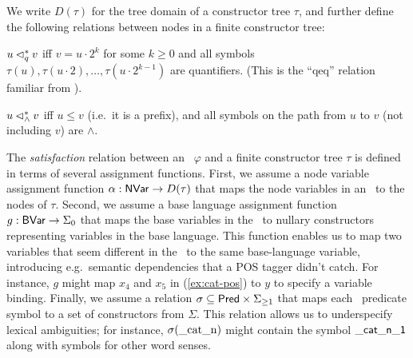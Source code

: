 We write $D(\tau)$ for the tree domain of a constructor tree $\tau$,
and further define the following relations between nodes in a finite
constructor tree:

\begin{definition}\label{defn:dominance}
$u \lhd^*_q v$ iff $v = u \cdot 2^k$ for some $k \geq 0$ and all
  symbols $\tau(u), \tau(u \cdot 2), \ldots, \tau(u \cdot 2^{k-1})$
  are quantifiers.  (This is the ``qeq'' relation familiar from
  ).

  $u \lhd^*_\wedge v$ iff $u \leq v$ (i.e.\ it is a prefix), and all
  symbols on the path from $u$ to $v$ (not including $v$) are
  $\wedge$.
\end{definition}

The {\em satisfaction} relation between an \rmrs\ $\varphi$ and a
finite constructor tree $\tau$ is defined in terms of several
assignment functions.  First, we assume a node variable assignment
function $\alpha: \mathsf{NVar} \rightarrow D(\tau)$ that maps the node
variables in an \rmrs\ to the nodes of $\tau$.  Second, we assume a
base language assignment function $g:\mathsf{BVar} \rightarrow \Sigma_0$ that
maps the base variables in the \rmrs\ to nullary constructors
representing variables in the base language.  This function enables us
to map two variables that seem different in the \rmrs\ to the same
base-language variable, introducing e.g.\ semantic dependencies that a
POS tagger didn't catch.  For instance, $g$ might map $x_4$ and $x_5$
in (\ref{ex:cat-pos}) to $y$ to specify a variable binding.  Finally,
we assume a relation $\sigma \subseteq \mathsf{Pred} \times \Sigma_{\geq 1}$
that maps each \rmrs\ predicate symbol to a set of constructors from
$\Sigma$.  This relation allows us to underspecify lexical
ambiguities; for instance, $\sigma(\mathrm{\_cat\_n})$ might contain
the symbol $\mathsf{\_cat\_n\_1}$ along with symbols for other word
senses.

